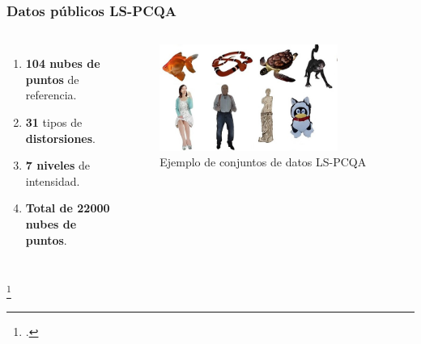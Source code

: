 \begin{frame}
\frametitle{Datos públicos LS-PCQA}
  \begin{columns}
    \begin{enumerate}
      \item \textbf{104 nubes de puntos} de referencia.  
      \item \textbf{31} tipos de \textbf{distorsiones}.
      \item \textbf{7 niveles} de intensidad.
      \item \textbf{Total de 22000 nubes de puntos}.
    \end{enumerate}
    \begin{figure}
      \includegraphics[width=0.8\textwidth]{imagenes/chapter3/LSPCQA}
      \caption{Ejemplo de conjuntos de datos LS-PCQA\footnotemark}
      \label{fig:LSSJTU}
    \end{figure}
  \end{columns}
  \footcitetext{ResSCNN}
\end{frame}

